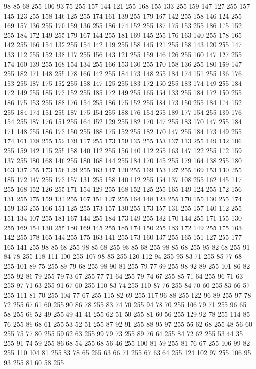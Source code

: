 98 85 68 255 106 93 75 255 157 144 121 255 168 155 133 255 159 147 127 255 157 145 123 255 158 146 125 255 174 161 139 255 179 167 142 255 158 146 124 255 169 157 136 255 170 159 136 255 186 174 152 255 187 175 153 255 186 175 152 255 184 172 149 255 179 167 144 255 181 169 145 255 176 163 140 255 178 165 142 255 166 154 132 255 154 142 119 255 158 145 121 255 158 143 120 255 147 133 112 255 152 138 117 255 156 143 121 255 159 146 126 255 160 147 127 255 174 160 139 255 168 154 134 255 166 153 130 255 170 158 136 255 180 169 147 255 182 171 148 255 178 166 142 255 184 173 148 255 184 174 151 255 186 176 153 255 187 175 152 255 158 147 125 255 183 172 150 255 183 174 149 255 184 172 149 255 185 173 152 255 185 172 149 255 165 154 133 255 184 172 150 255 186 175 153 255 188 176 154 255 186 175 152 255 184 173 150 255 184 174 152 255 184 174 151 255 187 175 154 255 188 176 154 255 189 177 154 255 189 176 154 255 187 176 151 255 164 152 129 255 182 170 147 255 183 170 147 255 184 171 148 255 186 173 150 255
188 175 152 255 182 170 147 255 184 173 149 255 174 161 138 255 152 139 117 255 173 159 135 255 153 137 113 255 149 132 106 255 159 142 115 255 158 140 112 255 156 140 112 255 163 147 122 255 172 159 137 255 180 168 146 255 180 168 144 255 184 170 145 255 179 164 138 255 180 163 137 255 173 156 129 255 163 147 120 255 169 153 127 255 169 153 130 255 185 172 147 255 173 157 131 255 158 140 112 255 154 137 108 255 162 145 117 255 168 152 126 255 171 154 129 255 168 152 125 255 165 149 124 255 172 156 131 255 175 159 134 255 167 151 127 255 164 148 123 255 170 155 130 255 174 159 133 255 166 151 125 255 173 157 130 255 173 157 131 255 157 140 112 255 151 134 107 255 181 167 144 255 184 173 149 255 182 170 144 255 171 155 130 255 169 154 130 255 180 169 145 255 185 174 150 255 183 172 149 255 175 163 142 255 178 165 144 255 175 163 141 255 173 160 137 255 165 151 127 255 177 165 141 255 98 85 68 255 98 85 68 255 98 85 68 255 98 85 68 255 95 82 68 255 91 84 78 255 118 111 100 255 107 98 85 255
120 112 94 255 95 83 71 255 85 77 68 255 101 89 75 255 89 79 68 255 98 90 81 255 79 77 69 255 98 92 89 255 101 86 82 255 92 86 79 255 79 73 67 255 77 71 64 255 79 74 67 255 85 71 64 255 96 71 63 255 97 71 63 255 91 67 60 255 110 83 74 255 110 87 76 255 84 70 60 255 83 66 57 255 111 81 70 255 104 77 67 255 115 82 69 255 117 96 88 255 122 96 89 255 97 78 72 255 67 61 60 255 90 86 78 255 83 74 70 255 94 78 70 255 106 79 71 255 96 65 58 255 69 52 49 255 49 41 41 255 62 51 50 255 81 60 56 255 129 92 78 255 114 85 76 255 89 68 61 255 53 52 51 255 87 92 91 255 88 95 97 255 56 62 68 255 48 56 60 255 75 77 80 255 59 62 63 255 99 79 73 255 89 76 64 255 84 72 62 255 53 44 35 255 91 74 59 255 86 68 54 255 68 56 46 255 100 81 59 255 81 76 67 255 106 99 82 255 110 104 81 255 83 78 65 255 63 66 71 255 67 63 64 255 124 102 97 255 106 95 93 255 81 60 58 255
